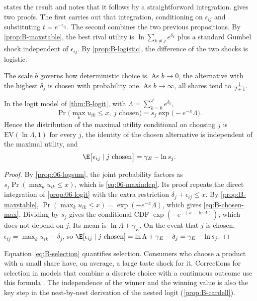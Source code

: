 \citet[eqs.~3.14--3.15, pp.~1411--1412]{McFadden1984} states the result and notes that it follows by a
straightforward integration.  gives two proofs. The first carries out that integration,
conditioning on $\epsilon_{ij}$ and substituting $t = e^{-\epsilon_{ij}}$. The second combines the two previous
propositions. By \cref{prop:B-maxstable}, the best rival utility is $\ln\sum_{k \neq j}e^{\delta_k}$ plus a standard
Gumbel shock independent of $\epsilon_{ij}$. By \cref{prop:B-logistic}, the difference of the two shocks is logistic.

The scale $b$ governs how deterministic choice is. As $b \to 0$, the alternative with the highest $\delta_j$
is chosen with probability one. As $b \to \infty$, all shares tend to $\frac{1}{J + 1}$.

\begin{proposition}\label{prop:B-chosen-max}
In the logit model of \cref{thm:B-logit}, with $\Lambda = \sum_{k = 0}^Je^{\delta_k}$,
\begin{equation}\label{eq:B-chosen-max}
\Pr\Big(\max_k u_{ik} \leq x,\ j \text{ chosen}\Big) = s_j\exp\big(-e^{-x}\Lambda\big).
\end{equation}
Hence the distribution of the maximal utility conditional on choosing $j$ is $\mathrm{EV}(\ln\Lambda, 1)$ for
every $j$, the identity of the chosen alternative is independent of the maximal utility, and
\begin{equation}\label{eq:B-selection}
\E\big[\epsilon_{ij} \mid j \text{ chosen}\big] = \gamma_E - \ln s_j .
\end{equation}
\end{proposition}

\begin{proof}
By \cref{prop:06-logsum}, the joint probability factors as
$s_j\Pr(\max_ku_{ik} \leq x)$, which is \eqref{eq:06-maxindep}. Its proof repeats the direct integration of \cref{prop:06-logit} with the extra
restriction $\delta_j + \epsilon_{ij} \leq x$. By \cref{prop:B-maxstable}, $\Pr(\max_ku_{ik} \leq x) = \exp(-e^{-x}\Lambda)$,
which gives \eqref{eq:B-chosen-max}. Dividing by $s_j$ gives the conditional CDF $\exp(-e^{-(x - \ln\Lambda)})$,
which does not depend on $j$. Its mean is $\ln\Lambda + \gamma_E$. On the event that $j$ is chosen, $\epsilon_{ij} = \max_ku_{ik} - \delta_j$, so
$\E[\epsilon_{ij} \mid j \text{ chosen}] = \ln\Lambda + \gamma_E - \delta_j = \gamma_E - \ln s_j$.
\end{proof}

Equation \eqref{eq:B-selection} quantifies selection. Consumers who choose a product with a small share have,
on average, a large taste shock for it. Corrections for selection in models that combine a discrete choice
with a continuous outcome use this formula \citep{DubinMcFadden1984}. The independence of the winner and
the winning value is also the key step in the nest-by-nest derivation of the nested logit (\cref{prop:B-cardell}).

